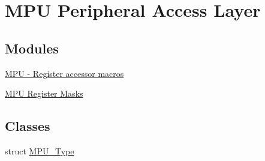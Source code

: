 \hypertarget{group__MPU__Peripheral__Access__Layer}{}\section{M\+PU Peripheral Access Layer}
\label{group__MPU__Peripheral__Access__Layer}
\subsection*{Modules}
\begin{DoxyCompactItemize}
\item 
\hyperlink{group__MPU__Register__Accessor__Macros}{M\+P\+U -\/ Register accessor macros}
\item 
\hyperlink{group__MPU__Register__Masks}{M\+P\+U Register Masks}
\end{DoxyCompactItemize}
\subsection*{Classes}
\begin{DoxyCompactItemize}
\item 
struct \hyperlink{structMPU__Type}{M\+P\+U\+\_\+\+Type}
\end{DoxyCompactItemize}
